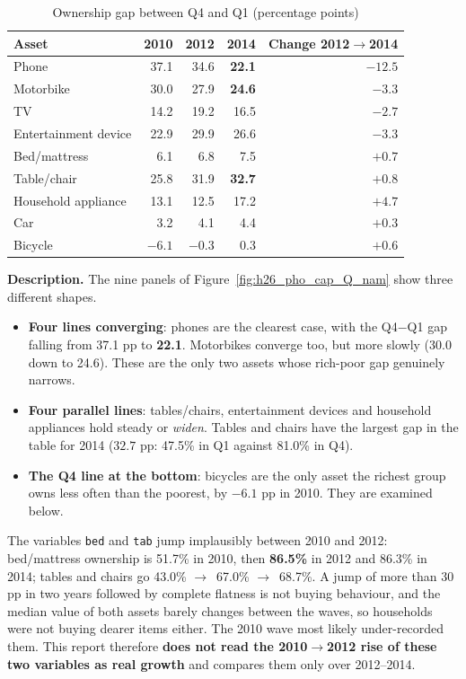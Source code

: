 \documentclass[11pt,a4paper]{article}
\newcommand{\ra}{$\rightarrow$}
\newcommand{\n}[1]{\textbf{#1}}
\begin{document}
\begin{table}[H]\centering\small
\caption{Ownership gap between Q4 and Q1 (percentage points)}
\begin{tabular}{lrrrr}
\toprule
Asset & 2010 & 2012 & 2014 & Change 2012\ra2014\\
\midrule
Phone & 37.1 & 34.6 & \textbf{22.1} & $-12.5$\\
Motorbike & 30.0 & 27.9 & \textbf{24.6} & $-3.3$\\
TV & 14.2 & 19.2 & 16.5 & $-2.7$\\
Entertainment device & 22.9 & 29.9 & 26.6 & $-3.3$\\
Bed/mattress & 6.1 & 6.8 & 7.5 & $+0.7$\\
Table/chair & 25.8 & 31.9 & \textbf{32.7} & $+0.8$\\
Household appliance & 13.1 & 12.5 & 17.2 & $+4.7$\\
Car & 3.2 & 4.1 & 4.4 & $+0.3$\\
Bicycle & $-6.1$ & $-0.3$ & 0.3 & $+0.6$\\
\bottomrule
\end{tabular}
\end{table}

\textbf{Description.} The nine panels of Figure~\ref{fig:h26_pho_cap_Q_nam} show three different shapes.

\begin{itemize}[leftmargin=1.3em,itemsep=3pt,topsep=2pt]
\item \n{Four lines converging}: phones are the clearest case, with the Q4$-$Q1 gap falling from 37.1 pp to \n{22.1}. Motorbikes converge too, but more slowly (30.0 down to 24.6). These are the only two assets whose rich-poor gap genuinely narrows.
\item \n{Four parallel lines}: tables/chairs, entertainment devices and household appliances hold steady or \emph{widen}. Tables and chairs have the largest gap in the table for 2014 ($32.7$ pp: 47.5\% in Q1 against 81.0\% in Q4).
\item \n{The Q4 line at the bottom}: bicycles are the only asset the richest group owns less often than the poorest, by $-6.1$ pp in 2010. They are examined below.
\end{itemize}

\begin{luuy}
The variables \texttt{bed} and \texttt{tab} jump implausibly between 2010 and 2012: bed/mattress ownership is 51.7\% in 2010, then \n{86.5\%} in 2012 and 86.3\% in 2014; tables and chairs go 43.0\% \ra\ 67.0\% \ra\ 68.7\%. A jump of more than 30 pp in two years followed by complete flatness is not buying behaviour, and the median value of both assets barely changes between the waves, so households were not buying dearer items either. The 2010 wave most likely under-recorded them. This report therefore \n{does not read the 2010\ra2012 rise of these two variables as real growth} and compares them only over 2012--2014.
\end{luuy}
\end{document}
